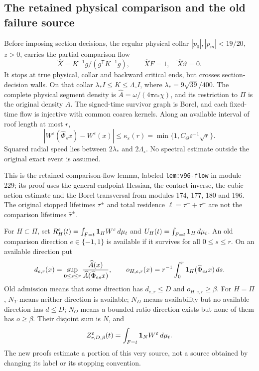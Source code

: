 \subsection{The retained physical comparison and the old failure source}
\begin{inputstatement}
\label{input:v97-comparison}
Before imposing section decisions, the regular physical collar
$|p_0|,|p_m|<19/20$, $z>0$, carries the partial comparison flow
\[
 \widehat X=K^{-1}g/(g^{\mathsf T}K^{-1}g),\qquad
 \widehat XF=1,\quad \widehat X\vartheta=0.
\]
It stops at true physical, collar and backward critical ends, but
crosses section-decision walls. On that collar
$\lambda_*I\le K\le\Lambda_\circ I$, where
$\lambda_*=9\sqrt{39}/400$. The complete physical segment density is
$\widehat A=\omega/(4\pi c_*\chi)$, and its restriction to $\Pi$
is the original density $A$. The signed-time survivor graph is Borel,
and each fixed-time flow is injective with common coarea kernels.
Along an available interval of roof length at most $r$,
\[
 |W^\varepsilon(\widehat\Phi_sx)-W^\varepsilon(x)|
 \le\kappa_\varepsilon(r)=\min\{1,C_\Theta\varepsilon^{-1}\sqrt r\}.
\]
Squared radial speed lies between $2\lambda_*$ and $2\Lambda_\circ$.
No spectral estimate outside the original exact event is assumed.
\end{inputstatement}
This is the retained comparison-flow lemma, labeled
\texttt{lem:v96-flow} in module 229; its proof uses the general
endpoint Hessian, the contact inverse, the cubic action estimate and
the Borel transversal from modules 174, 177, 180 and 196.
The original stopped lifetimes $\tau^\pm$ and total residence
$\ell=\tau^-+\tau^+$ are not the comparison lifetimes
$\widehat\tau^\pm$.

For $H\subset\Pi$, set
$R_H^\varepsilon(t)=\int_{F=t}\mathbf1_HW^\varepsilon\,d\mu_t$
and $U_H(t)=\int_{F=t}\mathbf1_H\,d\mu_t$. An old comparison direction
$e\in\{-1,1\}$ is available if it survives for all $0\le s\le r$.
On an available direction put
\[
 d_{e,r}(x)=\sup_{0\le s\le r}
 \frac{\widehat A(x)}{\widehat A(\widehat\Phi_{es}x)},\qquad
 o_{H,e,r}(x)=r^{-1}\int_0^r\mathbf1_H(\widehat\Phi_{es}x)\,ds.
\]
Old admission means that some direction has $d_{e,r}\le D$ and
$o_{H,e,r}\ge\beta$. For $H=\Pi$, $N_T$ means neither direction
is available; $N_D$ means availability but no available direction
has $d\le D$; $N_O$ means a bounded-ratio direction exists but none
of them has $o\ge\beta$. Their disjoint sum is $N$, and
\[
 Z_{r,D,\beta}^\varepsilon(t)=\int_{F=t}\mathbf1_NW^\varepsilon\,d\mu_t.
\]
The new proofs estimate a portion of this very source, not a source
obtained by changing its label or its stopping convention.
